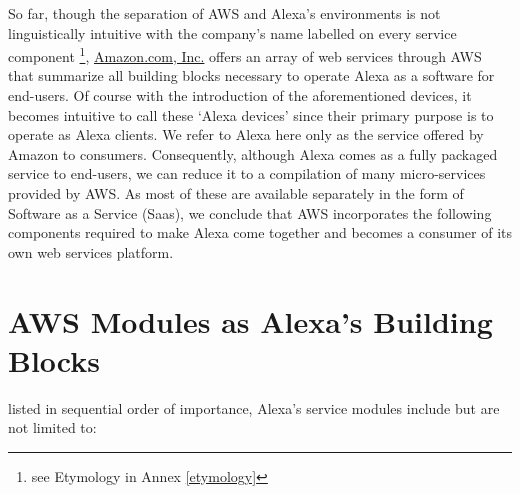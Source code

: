 So far, though the separation of AWS and Alexa's environments is not linguistically intuitive with the company's name labelled on every service component \footnote{see Etymology in Annex \ref{etymology}}, \href{http://www.amazon.com}{Amazon.com, Inc.} offers an array of web services through AWS that summarize all building blocks necessary to operate Alexa as a software for end-users. Of course with the introduction of the aforementioned devices, it becomes intuitive to call these `Alexa devices' since their primary purpose is to operate as Alexa clients. We refer to Alexa here only as the service offered by Amazon to consumers. Consequently, although Alexa comes as a fully packaged service to end-users, we can reduce it to a compilation of many micro-services provided by AWS. As most of these are available separately in the form of Software as a Service (Saas), we conclude that AWS incorporates the following components required to make Alexa come together and becomes a consumer of its own web services platform. 






\section{AWS Modules as Alexa's Building Blocks }
\label{aws:modules}

listed in sequential order of importance, Alexa's service modules include but are not limited to: 


